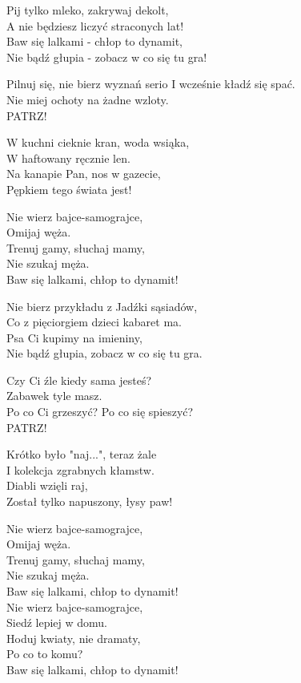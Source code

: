 \begin{text}
    Pij tylko mleko, zakrywaj dekolt,\\
    A nie będziesz liczyć straconych lat!\\
    Baw się lalkami - chłop to dynamit,\\
    Nie bądź głupia - zobacz w co się tu gra!

    Pilnuj się, nie bierz wyznań serio
    I wcześnie kładź się spać.\\
    Nie miej ochoty na żadne wzloty.\\
    PATRZ!

    W kuchni cieknie kran, woda wsiąka,\\
    W haftowany ręcznie len.\\
    Na kanapie Pan, nos w gazecie,\\
    Pępkiem tego świata jest!

    \vin Nie wierz bajce-samograjce,\\
    \vin Omijaj węża.\\
    \vin Trenuj gamy, słuchaj mamy,\\
    \vin Nie szukaj męża.\\
    \vin Baw się lalkami, chłop to dynamit!

    Nie bierz przykładu z Jadźki sąsiadów,\\
    Co z pięciorgiem dzieci kabaret ma.\\
    Psa Ci kupimy na imieniny,\\
    Nie bądź głupia, zobacz w co się tu gra.

    Czy Ci źle kiedy sama jesteś?\\
    Zabawek tyle masz.\\
    Po co Ci grzeszyć? Po co się spieszyć?\\
    PATRZ!

    Krótko było "naj...", teraz żale\\
    I kolekcja zgrabnych kłamstw.\\
    Diabli wzięli raj,\\
    Został tylko napuszony, łysy paw!

    \vin Nie wierz bajce-samograjce,\\
    \vin Omijaj węża.\\
    \vin Trenuj gamy, słuchaj mamy,\\
    \vin Nie szukaj męża.\\
    \vin Baw się lalkami, chłop to dynamit!\\
    \vin Nie wierz bajce-samograjce,\\
    \vin Siedź lepiej w domu.\\
    \vin Hoduj kwiaty, nie dramaty,\\
    \vin Po co to komu?\\
    \vin Baw się lalkami, chłop to dynamit!
\end{text}
\begin{chord}

\end{chord}